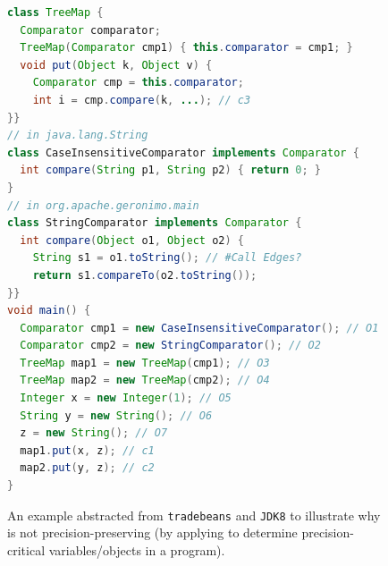 \begin{figure}[t]
\begin{center}
\begin{mdframed}[
align=center,
usetwoside=false,
 rightmargin=0.5cm,
innerleftmargin=1.0ex,
innertopmargin=0.2ex,
innerbottommargin=0.2ex
]
\begin{lstlisting}[language=java]
class TreeMap {
  Comparator comparator;
  TreeMap(Comparator cmp1) { this.comparator = cmp1; }
  void put(Object k, Object v) {
    Comparator cmp = this.comparator;
    int i = cmp.compare(k, ...); // c3
}}
// in java.lang.String 
class CaseInsensitiveComparator implements Comparator {
  int compare(String p1, String p2) { return 0; }
}
// in org.apache.geronimo.main
class StringComparator implements Comparator {
  int compare(Object o1, Object o2) {
    String s1 = o1.toString(); // #Call Edges?
    return s1.compareTo(o2.toString()); 
}}
void main() {
  Comparator cmp1 = new CaseInsensitiveComparator(); // O1
  Comparator cmp2 = new StringComparator(); // O2
  TreeMap map1 = new TreeMap(cmp1); // O3
  TreeMap map2 = new TreeMap(cmp2); // O4
  Integer x = new Integer(1); // O5
  String y = new String(); // O6
  z = new String(); // O7
  map1.put(x, z); // c1
  map2.put(y, z); // c2
}
\end{lstlisting}
\end{mdframed}
\end{center}
\caption{An example abstracted from \texttt{tradebeans} and \texttt{JDK8} to illustrate why \selectx  is not precision-preserving
(by applying \manuLFC to determine
precision-critical variables/objects in  a program). 
\label{fig:treemap}}
\end{figure}



